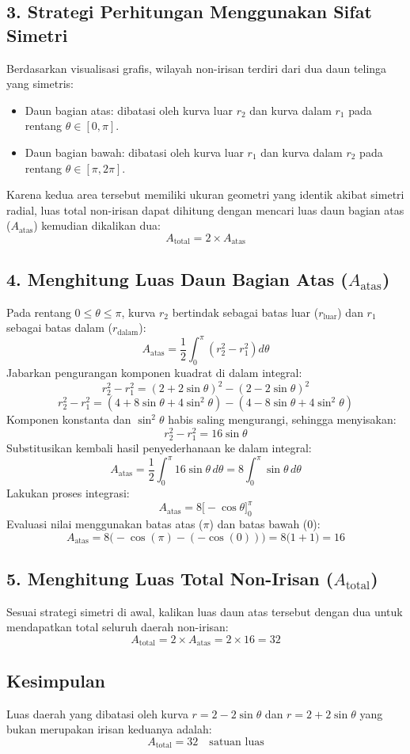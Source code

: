 \documentclass[12pt,a4paper]{article}
\begin{document}
\subsection*{3. Strategi Perhitungan Menggunakan Sifat Simetri}
Berdasarkan visualisasi grafis, wilayah non-irisan terdiri dari dua daun telinga yang simetris:
\begin{itemize}
  \item Daun bagian atas: dibatasi oleh kurva luar $r_2$ dan kurva dalam $r_1$ pada rentang $\theta \in [0, \pi]$.
  \item Daun bagian bawah: dibatasi oleh kurva luar $r_1$ dan kurva dalam $r_2$ pada rentang $\theta \in [\pi, 2\pi]$.
\end{itemize}
Karena kedua area tersebut memiliki ukuran geometri yang identik akibat simetri radial, luas total non-irisan dapat dihitung dengan mencari luas daun bagian atas ($A_{\text{atas}}$) kemudian dikalikan dua:
\[
A_{\text{total}} = 2 \times A_{\text{atas}}
\]

\subsection*{4. Menghitung Luas Daun Bagian Atas ($A_{\text{atas}}$)}
Pada rentang $0 \le \theta \le \pi$, kurva $r_2$ bertindak sebagai batas luar ($r_{\text{luar}}$) dan $r_1$ sebagai batas dalam ($r_{\text{dalam}}$):
\[
A_{\text{atas}} = \frac{1}{2} \int_{0}^{\pi} \left( r_2^2 - r_1^2 \right) d\theta
\]
Jabarkan pengurangan komponen kuadrat di dalam integral:
\[
r_2^2 - r_1^2 = (2 + 2\sin\theta)^2 - (2 - 2\sin\theta)^2
\]
\[
r_2^2 - r_1^2 = (4 + 8\sin\theta + 4\sin^2\theta) - (4 - 8\sin\theta + 4\sin^2\theta)
\]
Komponen konstanta dan $\sin^2\theta$ habis saling mengurangi, sehingga menyisakan:
\[
r_2^2 - r_1^2 = 16\sin\theta
\]
Substitusikan kembali hasil penyederhanaan ke dalam integral:
\[
A_{\text{atas}} = \frac{1}{2} \int_{0}^{\pi} 16\sin\theta \, d\theta = 8 \int_{0}^{\pi} \sin\theta \, d\theta
\]
Lakukan proses integrasi:
\[
A_{\text{atas}} = 8 \Big[ -\cos\theta \Big]_{0}^{\pi}
\]
Evaluasi nilai menggunakan batas atas ($\pi$) dan batas bawah ($0$):
\[
A_{\text{atas}} = 8 \Big( -\cos(\pi) - (-\cos(0)) \Big) = 8 \Big( 1 + 1 \Big) = 16
\]

\subsection*{5. Menghitung Luas Total Non-Irisan ($A_{\text{total}}$)}
Sesuai strategi simetri di awal, kalikan luas daun atas tersebut dengan dua untuk mendapatkan total seluruh daerah non-irisan:
\[
A_{\text{total}} = 2 \times A_{\text{atas}} = 2 \times 16 = 32
\]

\subsection*{Kesimpulan}
Luas daerah yang dibatasi oleh kurva $r = 2 - 2\sin\theta$ dan $r = 2 + 2\sin\theta$ yang bukan merupakan irisan keduanya adalah:
\[
A_{\text{total}} = 32 \quad \text{satuan luas}
\]
\end{document}
